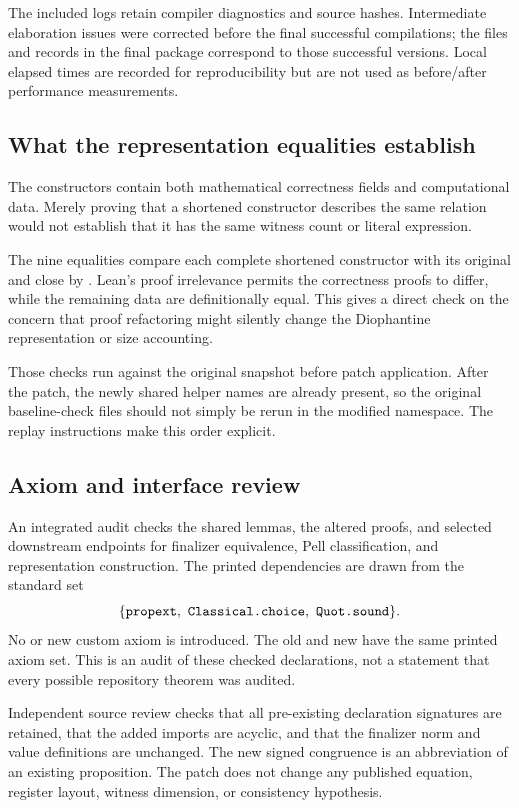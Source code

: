 \documentclass[11pt,letterpaper]{article}
\newcommand{\code}[1]{\texttt{\detokenize{#1}}}
\begin{document}
The included logs retain compiler diagnostics and source hashes. Intermediate
elaboration issues were corrected before the final successful compilations;
the files and records in the final package correspond to those successful
versions. Local elapsed times are recorded for reproducibility but are not
used as before/after performance measurements.

\subsection{What the representation equalities establish}

The \code{Rep} constructors contain both mathematical correctness fields and
computational data. Merely proving that a shortened constructor describes the
same relation would not establish that it has the same witness count or
literal expression.

The nine equalities compare each complete shortened constructor with its
original and close by \code{rfl}. Lean's proof irrelevance permits the
correctness proofs to differ, while the remaining data are definitionally
equal. This gives a direct check on the concern that proof refactoring might
silently change the Diophantine representation or size accounting.

Those checks run against the original snapshot before patch application.
After the patch, the newly shared helper names are already present, so the
original baseline-check files should not simply be rerun in the modified
namespace. The replay instructions make this order explicit.

\subsection{Axiom and interface review}

An integrated \code{#print axioms} audit checks the shared lemmas, the altered
proofs, and selected downstream endpoints for finalizer equivalence,
Pell classification, and representation construction.
The printed dependencies are drawn from the standard set
\[
 \{\code{propext},\ \code{Classical.choice},\ \code{Quot.sound}\}.
\]
No \code{sorryAx} or new custom axiom is introduced. The old and new
\code{firstUnit_fundamental} have the same printed axiom set.
This is an audit of these checked declarations, not a statement that every
possible repository theorem was audited.

Independent source review checks that all pre-existing declaration signatures
are retained, that the added imports are acyclic, and that the finalizer norm
and value definitions are unchanged. The new signed congruence is an
abbreviation of an existing proposition. The patch does not change any
published equation, register layout, witness dimension, or consistency
hypothesis.
\end{document}
